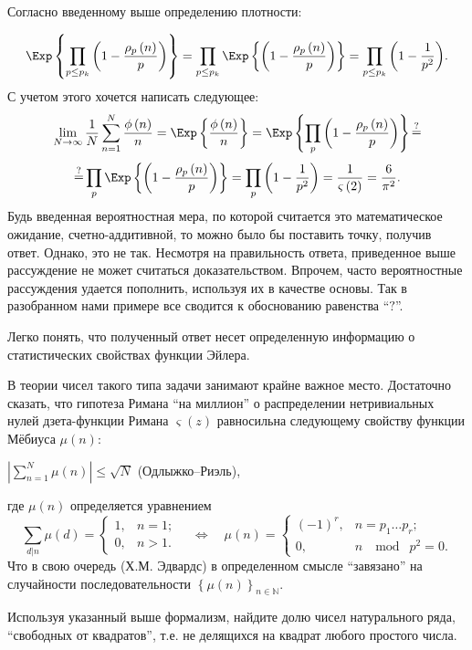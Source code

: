 \begin{problem}
\noindent Согласно введенному выше определению плотности:

\[
\Exp\left\{ {\prod\limits_{p\le p_k } {\left( {1-\frac{\rho _p \left( n 
\right)}{p}} \right)} } \right\}=\prod\limits_{p\le p_k } {\Exp\left\{ {\left( 
{1-\frac{\rho _p \left( n \right)}{p}} \right)} \right\}} 
=\prod\limits_{p\le p_k } {\left( {1-\frac{1}{p^2}} \right)} .
\]
С учетом этого хочется написать следующее:
\[
\mathop {\lim }\limits_{N\to \infty } \frac{1}{N}\sum\limits_{n=1}^N 
{\frac{\phi \left( n \right)}{n}} =\Exp\left\{ {\frac{\phi \left( n 
\right)}{n}} \right\}=\Exp\left\{ {\prod\limits_p {\left( {1-\frac{\rho _p 
\left( n \right)}{p}} \right)} } \right\}\mathop =\limits^? 
\]
\[
\mathop =\limits^? \prod\limits_p {\Exp\left\{ {\left( {1-\frac{\rho _p \left( 
n \right)}{p}} \right)} \right\}} =\prod\limits_p {\left( {1-\frac{1}{p^2}} 
\right)} =\frac{1}{\varsigma \left( 2 \right)}=\frac{6}{\pi ^2}.
\]
Будь введенная вероятностная мера, по которой считается это математическое 
ожидание, счетно-аддитивной, то можно было бы поставить точку, получив 
ответ. Однако, это не так. Несмотря на правильность ответа, 
приведенное выше рассуждение не может считаться доказательством. Впрочем, 
часто вероятностные рассуждения удается пополнить, используя их в качестве 
основы. Так в разобранном нами примере все сводится к обоснованию равенства 
``$?$''.

Легко понять, что полученный ответ несет определенную информацию о 
статистических свойствах функции Эйлера.

В теории чисел такого типа задачи занимают крайне важное место. Достаточно 
сказать, что гипотеза Римана ``на миллион'' о распределении нетривиальных 
нулей дзета-функции Римана $\varsigma \left( z \right)$ равносильна 
следующему свойству функции Мёбиуса $\mu(n)$:

\begin{center}
$\left| {\sum\limits_{n=1}^N {\mu \left( n \right)} } \right|\le \sqrt N $ 
(Одлыжко--Риэль),
\end{center}
где $\mu(n)$ определяется уравнением
\[
\sum\limits_{d \vert n} \mu(d) = 
\begin{cases}
1, & n = 1; \\
0, & n > 1.
\end{cases}
\quad
\Leftrightarrow
\quad
\mu(n) = 
\begin{cases}
(-1)^r, & n = p_1\ldots p_r; \\
0, & n \;  \mod \; p^2 = 0.
\end{cases}
\]
Что в свою очередь (Х.М. Эдвардс) в определенном смысле ``завязано'' на 
случайности последовательности $\left\{ {\mu \left( n \right)} 
\right\}_{n\in {\mathbb N}} $.

Используя указанный выше формализм, найдите долю чисел натурального ряда, 
``свободных от квадратов'', т.е. не делящихся на квадрат любого простого 
числа.

\end{problem}

